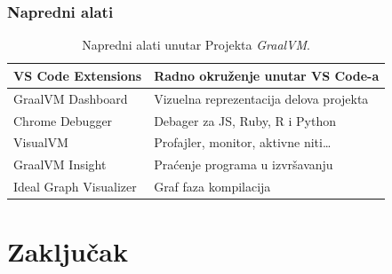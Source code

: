 \documentclass{beamer}
\begin{document}
	\begin{frame}
		\frametitle{Napredni alati}
        \begin{table}
            \centering
            \begin{tabular}{|l|l|}
                \hline
                VS Code Extensions & Radno okruženje unutar VS Code-a\\
                \hline
                GraalVM Dashboard & Vizuelna reprezentacija delova projekta\\
                \hline
                Chrome Debugger & Debager za JS, Ruby, R i Python\\
                \hline
                VisualVM & Profajler, monitor, aktivne niti\ldots\\
                \hline
                GraalVM Insight & Praćenje programa u izvršavanju\\
                \hline
                Ideal Graph Visualizer & Graf faza kompilacija\\
                \hline
            \end{tabular}
            \caption{Napredni alati unutar Projekta \emph{GraalVM}.}\label{alati}
        \end{table}
	\end{frame}	

	\section{Zaključak}
	
\end{document}
